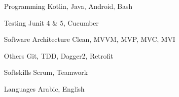 

\begin{cvskills}

  \cvskill
    {Programming} %
    {Kotlin, Java, Android, Bash} %

  \cvskill
    {Testing} %
    {Junit 4 \& 5, Cucumber} %

  \cvskill
    {Software Architecture} %
    {Clean, MVVM, MVP, MVC, MVI} %

  \cvskill
    {Others} %
    {Git, TDD, Dagger2, Retrofit} %

  \cvskill
    {Softskills} %
    {Scrum, Teamwork} %

  \cvskill
    {Languages} %
    {Arabic, English} %

\end{cvskills}